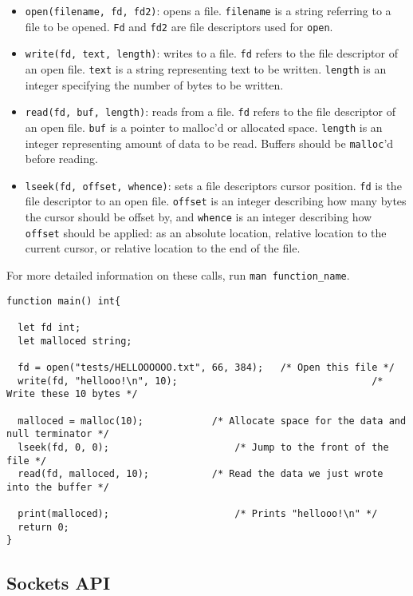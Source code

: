 		\begin{itemize}
			\item \texttt{open(filename, fd, fd2)}: opens a file. \texttt{filename} is a string referring to a file to be opened. \texttt{Fd} and \texttt{fd2} are file descriptors used for \texttt{open}.
			\item \texttt{write(fd, text, length)}: writes to a file. \texttt{fd} refers to the file descriptor of an open file. \texttt{text} is a string representing text to be written. \texttt{length} is an integer specifying the number of bytes to be written.
			\item \texttt{read(fd, buf, length)}: reads from a file. \texttt{fd} refers to the file descriptor of an open file. \texttt{buf} is a pointer to malloc'd or allocated space. \texttt{length} is an integer representing amount of data to be read. Buffers should be \texttt{malloc}'d before reading. 
			\item \texttt{lseek(fd, offset, whence)}: sets a file descriptors cursor position. \texttt{fd} is the file descriptor to an open file. \texttt{offset} is an integer describing how many bytes the cursor should be offset by, and \texttt{whence} is an integer describing how \texttt{offset} should be applied: as an absolute location, relative location to the current cursor, or relative location to the end of the file.
		\end{itemize}

		\noindent
		For more detailed information on these calls, run \texttt{man function\_name}.

		\begin{lstlisting}
function main() int{

  let fd int;
  let malloced string;
  
  fd = open("tests/HELLOOOOOO.txt", 66, 384); 	/* Open this file */
  write(fd, "hellooo!\n", 10); 									/* Write these 10 bytes */
  
  malloced = malloc(10); 			/* Allocate space for the data and null terminator */
  lseek(fd, 0, 0);						/* Jump to the front of the file */
  read(fd, malloced, 10);			/* Read the data we just wrote into the buffer */
  
  print(malloced);						/* Prints "hellooo!\n" */
  return 0;
}
		\end{lstlisting}

	\subsection{Sockets API}
